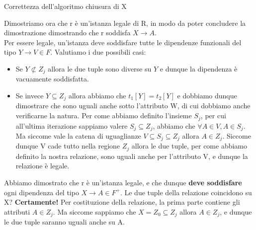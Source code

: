 \documentclass[12pt]{report}
\newcommand{\ra}{
	\rightarrow
}
\begin{document}
\begin{dimostrazione}{Correttezza dell'algoritmo chiusura di X}{}
\begin{center}
		\end{center}
		Dimostriamo ora che r è un'istanza legale di R, in modo da poter concludere la dimostrazione dimostrando che r soddisfa $X \ra A$.\\
		Per essere legale, un'istanza deve soddisfare tutte le dipendenze funzionali del tipo $Y \ra V \in F$. Valutiamo i due possibili casi:
		\begin{itemize}
			\item Se $Y \not\subset Z_j$ allora le due tuple sono diverse su $Y$ e dunque la dipendenza è vacuamente soddisfatta.
			
			\item Se invece $Y \subseteq Z_j$ allora abbiamo che $t_1[Y] = t_2[Y]$ e dobbiamo dunque dimostrare che sono uguali anche sotto l'attributo W, di cui dobbiamo anche verificarne la natura. Per come abbiamo definito l'insieme $S_j$, per cui all'ultima iterazione sappiamo valere $S_j \subseteq Z_j$, abbiamo che $\forall A \in V, A \in S_j$. Ma siccome vale la catena di uguaglianze $V \subseteq S_j \subseteq Z_j$ allora $A \in Z_j$. Siccome dunque V cade tutto nella regione $Z_j$ allora le due tuple, per come abbiamo definito la nostra relazione, sono uguali anche per l'attributo V, e dunque la relazione è legale.
		\end{itemize}
		
		Abbiamo dimostrato che r è un'istanza legale, e che dunque \textbf{deve soddisfare} ogni dipendenza del tipo $X \ra A \in F^+$. Le due tuple della relazione coincidono su X? \textbf{Certamente!} Per costituzione della relazione, la prima parte contiene gli attributi $A \in Z_j$. Ma siccome sappiamo che $X = Z_0 \subseteq Z_j$ allora $A \in Z_j$, e dunque le due tuple saranno uguali anche su A.
	\end{dimostrazione}
	
\end{document}

